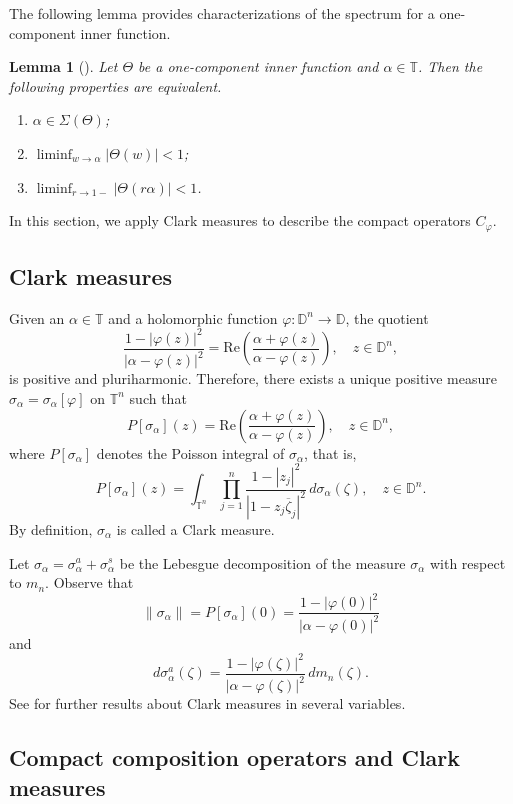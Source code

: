 \documentclass{amsart}
\numberwithin{equation}{section}
\newtheorem{lemma}[theorem]{Lemma}
\theoremstyle{definition}
\newcommand{\al}{\alpha}
\newcommand{\clk}{\sigma}
\newcommand{\meal}{m_n}
\newcommand{\diin}{\Theta}
\newcommand{\za}{\zeta}
\newcommand{\ph}{\varphi}
\newcommand{\cph}{C_\varphi}
\newcommand{\Dbb}{\mathbb D}
\newcommand{\Tbb}{\mathbb T}
\newcommand{\Rl}{\mathrm{Re}}
\newcommand{\tn}{\mathbb{T}^n}
\newcommand{\dn}{\mathbb{D}^n}
\newcommand{\spr}{\Sigma}
\begin{document}
The following lemma provides characterizations of the spectrum for
a one-compo\-nent inner function.

\begin{lemma}[{\cite[Section~5]{VT88}}]\label{l_A}
Let $\diin$ be a one-component inner function and $\al\in\Tbb$. Then the following properties are equivalent.
\begin{enumerate}
  \item[$\bullet$] $\al\in\spr(\diin)$;
  \item[$\bullet$] $\liminf_{w\to\al} |\diin(w)| <1$;
  \item[$\bullet$] $\liminf_{r\to 1-} |\diin(r\al)| <1$.
\end{enumerate}
\end{lemma}

In this section, we apply Clark measures to describe the compact operators $\cph$.

\subsection{Clark measures}
Given an $\alpha\in\Tbb$ and a holomorphic function $\ph: \dn\to \Dbb$, the quotient
\[
\frac{1-|\ph(z)|^2}{|\al-\ph(z)|^2}= \Rl \left(\frac{\al+ \ph(z)}{\al- \ph(z)} \right), \quad z\in \dn,
\]
is positive and pluriharmonic.
Therefore, there exists a unique positive measure $\clk_\al= \clk_\al[\ph]$ on $\tn$
such that
\[
P[\clk_\al](z) = \Rl \left(\frac{\al+ \ph(z)}{\al- \ph(z)} \right), \quad z\in \dn,
\]
where $P[\clk_\al]$ denotes the Poisson integral of $\clk_\al$, that is,
\[
P[\clk_\al](z) = \int_{\tn} \prod_{j=1}^{n} \frac{1-|z_j|^2}{|1-z_j \overline{\za}_j|^2}\, d\clk_\al(\za), \quad z\in \dn.
\]
By definition, $\clk_\al$ is called a Clark measure.

Let $\clk_\al = \clk_\al^a + \clk_\al^s$ be the Lebesgue decomposition
of the measure $\clk_\al$ with respect to $\meal$.
Observe that
\[
\|\clk_\al\| = P[\clk_\al](0) = \frac{1-|\ph(0)|^2}{|\al - \ph(0)|^2}
\]
and
\[
d\clk_\al^a (\za)= \frac{1-|\ph(\za)|^2}{|\al - \ph(\za)|^2}\, d\meal(\za).
\]
See \cite{AD20} %
for further results about Clark measures in several variables.


\subsection{Compact composition operators and Clark measures}
\end{document}
